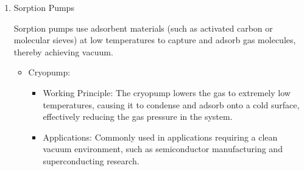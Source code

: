 \begin{enumerate}
\begin{enumerate}
\begin{enumerate}
			\begin{itemize}
				\item Turbo Molecular Pump (TMP):
				\begin{itemize}
					\item Working Principle: The turbo molecular pump uses high-speed rotating turbine blades to compress and discharge gas molecules step by step. The design of the turbine blades causes gas molecules to be gradually pushed toward the exhaust port through multiple collisions.
					\item Applications: Used for high and ultra-high vacuum generation, widely applied in electron microscopes, mass spectrometers, and semiconductor production equipment.
				\end{itemize}
				
				\item Diffusion Pump:
				\begin{itemize}
					\item Working Principle: The diffusion pump uses high-temperature oil vapor to form a high-speed jet stream. Gas molecules are captured by the vapor stream and expelled from the system. The diffusion pump has no moving parts, resulting in high reliability and long service life.
					\item Applications: Suitable for high vacuum environments and commonly used as the main pump in electron beam welding and vacuum coating equipment.
				\end{itemize}
			\end{itemize}
			
			\item Sorption Pumps
			
			Sorption pumps use adsorbent materials (such as activated carbon or molecular sieves) at low temperatures to capture and adsorb gas molecules, thereby achieving vacuum.
			
			\begin{itemize}
				\item Cryopump:
				\begin{itemize}
					\item Working Principle: The cryopump lowers the gas to extremely low temperatures, causing it to condense and adsorb onto a cold surface, effectively reducing the gas pressure in the system.
					\item Applications: Commonly used in applications requiring a clean vacuum environment, such as semiconductor manufacturing and superconducting research.
				\end{itemize}
				

\end{itemize}
\end{enumerate}
\end{enumerate}
\end{enumerate}
